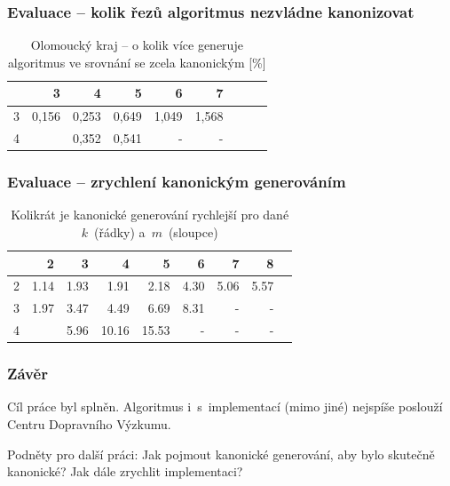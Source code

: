 \documentclass[10pt]{beamer}
\newcommand{\evenrowcolor}{\rowcolor[gray]{0.925}}
\begin{document}
\begin{frame}
	\frametitle{Evaluace -- kolik řezů algoritmus nezvládne kanonizovat}

\begin{table}[H]
	\caption{Olomoucký kraj -- o kolik více generuje algoritmus ve srovnání se zcela kanonickým [\%]}
	\centering
	\begin{tabular}{c|rrrrrrrr}

\toprule

            &         3 &         4 &         5 &         6 &         7 \\ \midrule
         3  &     0,156 &     0,253 &     0,649 &     1,049 &     1,568 \\
\evenrowcolor
         4  &           &     0,352 &     0,541 &         -  &       -  \\

	\end{tabular}
\end{table}

\end{frame}

\begin{frame}
	\frametitle{Evaluace -- zrychlení kanonickým generováním}

\begin{table}[H]
	\caption{Kolikrát je kanonické generování rychlejší pro dané $k$~(řádky) a~$m$~(sloupce)}
	\centering
	\begin{tabular}{c|rrrrrrrr}

\toprule

   &         2 &         3 &         4 &         5 &         6 &     7 &     8 \\ \midrule
2  &      1.14 &      1.93 &      1.91 &      2.18 &      4.30 &  5.06 &  5.57 \\
\evenrowcolor
3  &      1.97 &      3.47 &      4.49 &      6.69 &      8.31 &     - &     - \\
4  &           &      5.96 &     10.16 &     15.53 &         - &     - &     - \\

	\end{tabular}
\end{table}

\end{frame}

\begin{frame}
	\frametitle{Závěr}

	Cíl práce byl splněn. Algoritmus i~s~implementací (mimo jiné) nejspíše poslouží Centru Dopravního Výzkumu.
\\
\bigskip

Podněty pro další práci: Jak pojmout kanonické generování, aby bylo skutečně kanonické? Jak dále zrychlit implementaci?


\end{frame}
\end{document}
